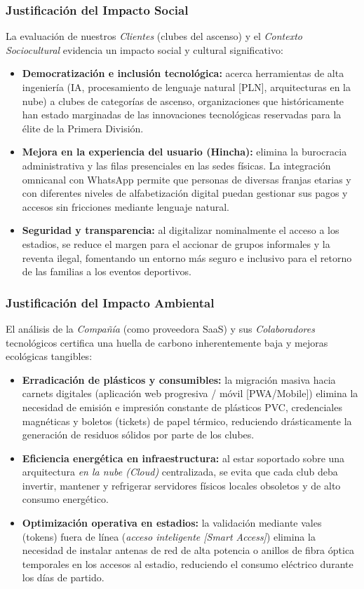 \subsubsection*{Justificación del Impacto Social}
La evaluación de nuestros \textit{Clientes} (clubes del ascenso) y el \textit{Contexto Sociocultural} evidencia un impacto social y cultural significativo:
\begin{itemize}
    \item \textbf{Democratización e inclusión tecnológica:} acerca herramientas de alta ingeniería (IA, procesamiento de lenguaje natural [PLN], arquitecturas en la nube) a clubes de categorías de ascenso, organizaciones que históricamente han estado marginadas de las innovaciones tecnológicas reservadas para la élite de la Primera División.
    \item \textbf{Mejora en la experiencia del usuario (Hincha):} elimina la burocracia administrativa y las filas presenciales en las sedes físicas. La integración omnicanal con WhatsApp permite que personas de diversas franjas etarias y con diferentes niveles de alfabetización digital puedan gestionar sus pagos y accesos sin fricciones mediante lenguaje natural.
    \item \textbf{Seguridad y transparencia:} al digitalizar nominalmente el acceso a los estadios, se reduce el margen para el accionar de grupos informales y la reventa ilegal, fomentando un entorno más seguro e inclusivo para el retorno de las familias a los eventos deportivos.
\end{itemize}

\subsubsection*{Justificación del Impacto Ambiental}
El análisis de la \textit{Compañía} (como proveedora SaaS) y sus \textit{Colaboradores} tecnológicos certifica una huella de carbono inherentemente baja y mejoras ecológicas tangibles:
\begin{itemize}
    \item \textbf{Erradicación de plásticos y consumibles:} la migración masiva hacia carnets digitales (aplicación web progresiva / móvil [PWA/Mobile]) elimina la necesidad de emisión e impresión constante de plásticos PVC, credenciales magnéticas y boletos (tickets) de papel térmico, reduciendo drásticamente la generación de residuos sólidos por parte de los clubes.
    \item \textbf{Eficiencia energética en infraestructura:} al estar soportado sobre una arquitectura \textit{en la nube (Cloud)} centralizada, se evita que cada club deba invertir, mantener y refrigerar servidores físicos locales obsoletos y de alto consumo energético.
    \item \textbf{Optimización operativa en estadios:} la validación mediante vales (tokens) fuera de línea (\textit{acceso inteligente [Smart Access]}) elimina la necesidad de instalar antenas de red de alta potencia o anillos de fibra óptica temporales en los accesos al estadio, reduciendo el consumo eléctrico durante los días de partido.
\end{itemize}

